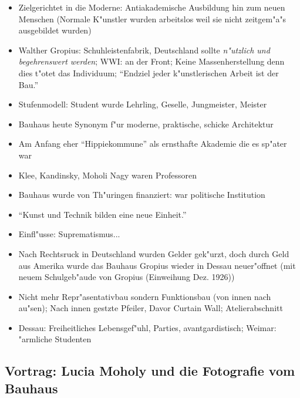 \documentclass[a5paper]{scrartcl}
\begin{document}
\begin{itemize}
  \item Zielgerichtet in die Moderne: Antiakademische Ausbildung hin zum neuen Menschen (Normale K"unstler wurden arbeitslos weil sie nicht zeitgem"a"s ausgebildet wurden)
  \item Walther Gropius: Schuhleistenfabrik, Deutschland sollte \emph{n"utzlich und begehrenswert werden}; WWI: an der Front; Keine Massenherstellung denn dies t"otet das Individuum; "`Endziel jeder k"unstlerischen Arbeit ist der Bau."'
  \item Stufenmodell: Student wurde Lehrling, Geselle, Jungmeister, Meister
  \item Bauhaus heute Synonym f"ur moderne, praktische, schicke Architektur
  \item Am Anfang eher "`Hippiekommune"' als ernsthafte Akademie die es sp"ater war
  \item Klee, Kandinsky, Moholi Nagy waren Professoren 
  \item Bauhaus wurde von Th"uringen finanziert: war politische Institution
  \item "`Kunst und Technik bilden eine neue Einheit."'
  \item Einfl"usse: Suprematismus...
  \item Nach Rechtsruck in Deutschland wurden Gelder gek"urzt, doch durch Geld aus Amerika wurde das Bauhaus Gropius wieder in Dessau neuer"offnet (mit neuem Schulgeb"aude von Gropius (Einweihung Dez. 1926)) 
  \item Nicht mehr Repr"asentativbau sondern Funktionsbau (von innen nach au"sen); Nach innen gestzte Pfeiler, Davor Curtain Wall; Atelierabschnitt
  \item Dessau: Freiheitliches Lebensgef"uhl, Parties, avantgardistisch; Weimar: "armliche Studenten
\end{itemize}

\subsection{Vortrag: Lucia Moholy und die Fotografie vom Bauhaus}
\end{document}
